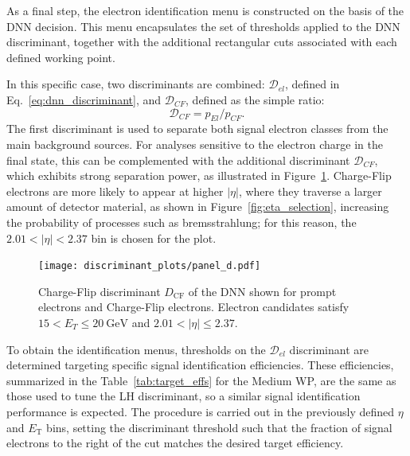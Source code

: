 As a final step, the electron identification menu is constructed on the basis of the DNN decision. This menu encapsulates the set of thresholds applied to the DNN discriminant, together with the additional rectangular cuts associated with each defined working point.

In this specific case, two discriminants are combined: $\mathcal{D}_{el}$, defined in Eq.~\ref{eq:dnn_discriminant}, and $\mathcal{D}_{CF}$, defined as the simple ratio:
\begin{equation}
  \mathcal{D}_{CF} = p_{El}/p_{CF}.
\label{cf_disc}
\end{equation}
The first discriminant is used to separate both signal electron classes from the main background sources. For analyses sensitive to the electron charge in the final state, this can be complemented with the additional discriminant $\mathcal{D}_{CF}$, which exhibits strong separation power, as illustrated in Figure~\ref{fig:cf_discriminant}. Charge-Flip electrons are more likely to appear at higher $|\eta|$, where they traverse a larger amount of detector material, as shown in Figure~\ref{fig:eta_selection}, increasing the probability of processes such as bremsstrahlung; for this reason, the $2.01 < |\eta| < 2.37$ bin is chosen for the plot.

\begin{figure}[htbp]
  \centering
  \texttt{[image: discriminant\_plots/panel\_d.pdf]}
  \caption{Charge-Flip discriminant $D_{\mathrm{CF}}$ of the DNN shown for prompt electrons and
  Charge-Flip electrons. Electron candidates satisfy $15<E_{T}\leq 20~\mathrm{GeV}$ and $2.01<|\eta|\leq 2.37$.}
  \label{fig:cf_discriminant}
\end{figure}

To obtain the identification menus, thresholds on the $\mathcal{D}_{el}$ discriminant are determined targeting specific signal identification efficiencies. These efficiencies, summarized in the Table~\ref{tab:target_effs} for the Medium WP, are the same as those used to tune the LH discriminant, so a similar signal identification performance is expected. The procedure is carried out in the previously defined $\eta$ and $E_{\text{T}}$ bins, setting the discriminant threshold such that the fraction of signal electrons to the right of the cut matches the desired target efficiency.

